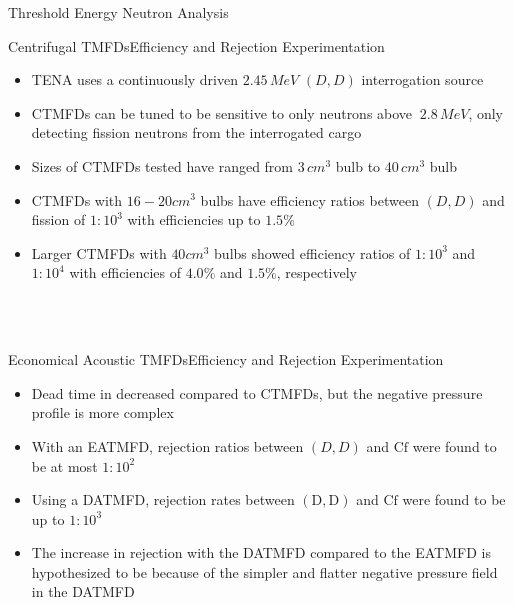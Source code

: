\begin{pucol}{7}{12}
\begin{pucell}{7}{6}{Threshold Energy Neutron Analysis}{}
\begin{pucell}{3}{3}{Centrifugal TMFDs}{Efficiency and Rejection Experimentation}
\begin{itemize}
      \item TENA uses a continuously driven $2.45\,MeV$ $\left(D,D\right)$ interrogation source
      \item CTMFDs can be tuned to be sensitive to only neutrons above $~2.8\,MeV$, only detecting fission neutrons from the interrogated cargo
      \item Sizes of CTMFDs tested have ranged from $3\,cm^{3}$ bulb to $40\,cm^{3}$ bulb
      \item CTMFDs with $16 - 20 cm^{3}$ bulbs have efficiency ratios between $\left(D,D\right)$ and fission of $1:10^{3}$ with efficiencies up to $1.5\%$
      \item Larger CTMFDs with $40 cm^{3}$ bulbs showed efficiency ratios of $1:10^{3}$ and $1:10^{4}$ with efficiencies of $4.0\%$ and $1.5\%$, respectively
    \end{itemize}
  \end{pucell}%
  \hspace*{\fill}
  \begin{pucell}{2}{3}{}{}
  \end{pucell}%
  \hspace*{\fill}
  \begin{pucell}{2}{3}{}{}
  \end{pucell} \\
  \vspace*{0.25in} \\
  \begin{pucell}{3}{3}{Economical Acoustic TMFDs}{Efficiency and Rejection Experimentation}
    \begin{itemize}
      \item Dead time in decreased compared to CTMFDs, but the negative pressure profile is more complex
      \item With an EATMFD, rejection ratios between $\left(D,D\right)$ and $\mathrm{Cf}$ were found to be at most $1:10^{2}$
      \item Using a DATMFD, rejection rates between $\mathrm{\left(D,D\right)}$ and $\mathrm{Cf}$ were found to be up to $1:10^{3}$
      \item The increase in rejection with the DATMFD compared to the EATMFD is hypothesized to be because of the simpler and flatter negative pressure field in the DATMFD

\end{itemize}
\end{pucell}
\end{pucell}
\end{pucol}
